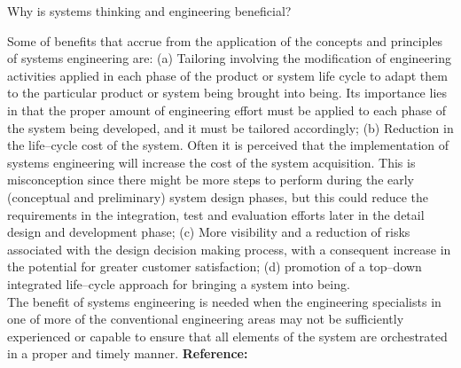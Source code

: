 \begin{exercises}
    \begin{exercise}
    \label{sea-2-24}
        Why is systems thinking and engineering beneficial?
    \end{exercise}
    \begin{solution}
        Some of benefits that accrue from the application of the concepts and principles of systems engineering are: (a) Tailoring involving the modification of engineering activities applied in each phase of the product or system life cycle to adapt them to the particular product or system being brought into being. Its importance lies in that the proper amount of engineering effort must be applied to each phase of the system being developed, and it must be tailored accordingly; (b) Reduction in the life–cycle cost of the system. Often it is perceived that the implementation of systems engineering will increase the cost of the system acquisition. This is misconception since there might be more steps to perform during the early (conceptual and preliminary) system design phases, but this could reduce the requirements in the integration, test and evaluation efforts later in the detail design and development phase; (c) More visibility and a reduction of risks associated with the design decision making process, with a consequent increase in the potential for greater customer satisfaction; (d) promotion of a top–down integrated life–cycle approach for bringing a system into being. \\
        The benefit of systems engineering is needed when the engineering specialists in one of more of the conventional engineering areas may not be sufficiently experienced or capable to ensure that all elements of the system are orchestrated in a proper and timely manner. \textbf{Reference:}
    \end{solution}
\end{exercises}
